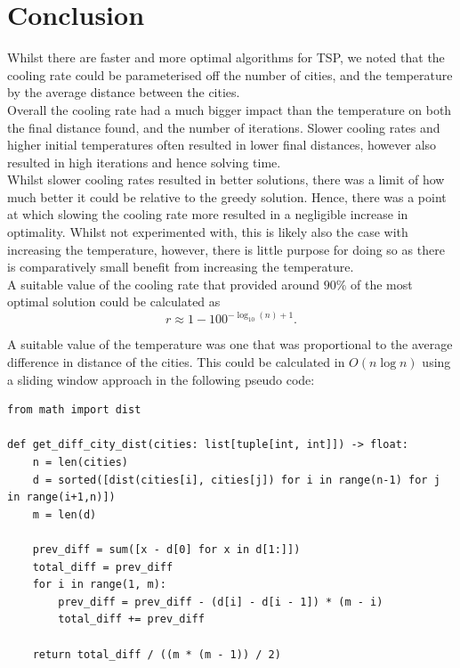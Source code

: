 \documentclass{article}
\begin{document}
\newpage
\section{Conclusion}
Whilst there are faster and more optimal algorithms for TSP, we noted that the cooling rate could be parameterised off the number of cities, and the temperature by the average distance between the cities.
\\

Overall the cooling rate had a much bigger impact than the temperature on both the final distance found, and the number of iterations.
Slower cooling rates and higher initial temperatures often resulted in lower final distances, however also resulted in high iterations and hence solving time.
\\

Whilst slower cooling rates resulted in better solutions, there was a limit of how much better it could be relative to the greedy solution.
Hence, there was a point at which slowing the cooling rate more resulted in a negligible increase in optimality.
Whilst not experimented with, this is likely also the case with increasing the temperature, however, there is little purpose for doing so as there is comparatively small benefit from increasing the temperature.
\\

A suitable value of the cooling rate that provided around $90\%$ of the most optimal solution could be calculated as 
$$r \approx 1 - 100^{-\log_{10}(n) + 1}.$$

A suitable value of the temperature was one that was proportional to the average difference in distance of the cities.
This could be calculated in $O(n\log n)$ using a sliding window approach in the following pseudo code:

\begin{verbatim}
from math import dist

def get_diff_city_dist(cities: list[tuple[int, int]]) -> float:
    n = len(cities)
    d = sorted([dist(cities[i], cities[j]) for i in range(n-1) for j in range(i+1,n)])
    m = len(d)
    
    prev_diff = sum([x - d[0] for x in d[1:]])
    total_diff = prev_diff
    for i in range(1, m):
        prev_diff = prev_diff - (d[i] - d[i - 1]) * (m - i)
        total_diff += prev_diff
    
    return total_diff / ((m * (m - 1)) / 2)
\end{verbatim}
\end{document}
